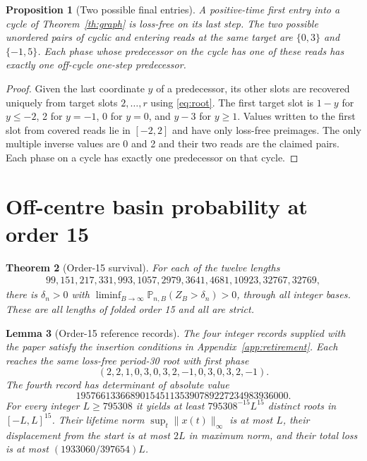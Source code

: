 \documentclass[11pt]{amsart}
\newtheorem{theorem}{Theorem}
\newtheorem{lemma}[theorem]{Lemma}
\newtheorem{proposition}[theorem]{Proposition}
\theoremstyle{definition}
\newcommand{\PP}{\mathbb P}
\begin{document}
\begin{proposition}[Two possible final entries]\label{prop:doors}
A positive-time first entry into a cycle of
Theorem~\ref{th:graph} is loss-free on its last step.
The two possible unordered pairs of cyclic and entering
reads at the same target are \(\{0,3\}\) and \(\{-1,5\}\).
Each phase whose predecessor on the cycle has one of
these reads has exactly one off-cycle one-step predecessor.
\end{proposition}
\begin{proof}
Given the last coordinate \(y\) of a predecessor, its
other slots are recovered uniquely from target slots
\(2,\ldots,r\) using \eqref{eq:root}. The first target
slot is \(1-y\) for \(y\le-2\), 2 for \(y=-1\), 0 for
\(y=0\), and \(y-3\) for \(y\ge1\). Values written to the first slot
from covered reads lie in \([-2,2]\) and have only loss-free preimages.
The only multiple inverse values are 0 and 2 and their
two reads are the claimed pairs. Each phase on a cycle
has exactly one predecessor on that cycle.
\end{proof}

\section{Off-centre basin probability at order 15}
\label{sec:order15}

\begin{theorem}[Order-15 survival]\label{th:order15}
For each of the twelve lengths
\[
 \begin{gathered}
 99,151,217,331,993,1057,2979,3641,4681,10923,32767,32769 ,
 \end{gathered}
\]
there is \(\delta_n>0\) with
\(\liminf_{B\to\infty}\PP_{n,B}(Z_B>\delta_n)>0\),
through all integer bases. These are all lengths of
folded order 15 and all are strict.
\end{theorem}

\begin{lemma}[Order-15 reference records]\label{lem:cert15}
The four integer records supplied with the paper satisfy
the insertion conditions in Appendix~\ref{app:retirement}.
Each reaches the same loss-free period-30 root with first phase
\[
 (2,2,1,0,3,0,3,2,-1,0,3,0,3,2,-1).
\]
The fourth record has determinant of absolute value
\[1957661336689015451135390789227234983936000.\]
For every integer \(L\ge795308\) it yields at least
\(795308^{-15}L^{15}\) distinct roots in \([-L,L]^{15}\).
Their lifetime norm \(\sup_t\|x(t)\|_\infty\) is at most \(L\), their
displacement from the start is at most \(2L\) in maximum norm, and
their total loss is at most \((1933060/397654)L\).
\end{lemma}
\end{document}
